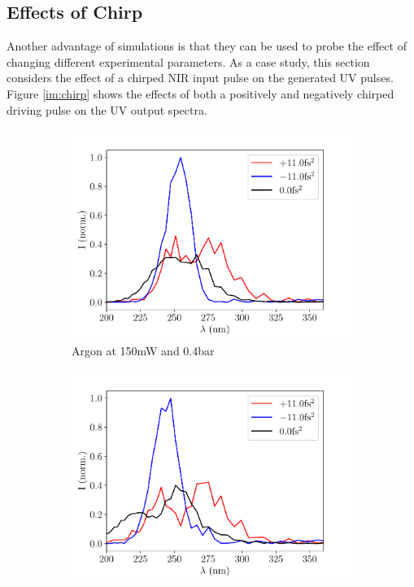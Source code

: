 \documentclass[a4paper]{jpconf}
\begin{document}
\subsection{Effects of Chirp}
Another advantage of simulations is that they can be used to probe the effect of changing different experimental parameters. As a case study, this section considers the effect of a chirped NIR input pulse on the generated UV pulses. Figure \ref{im:chirp} shows the effects of both a positively and negatively chirped driving pulse on the UV output spectra. 
\begin{figure}[h]
\centering
 \begin{subfigure}{0.49\textwidth}
\includegraphics[width=\textwidth]{im/Ar_chirp}
\caption{Argon at 150mW and 0.4bar}\label{im:chirp_Ar}
\end{subfigure}
 \begin{subfigure}{0.49\textwidth}
\includegraphics[width=\textwidth]{im/Ne_chirp}

\end{subfigure}
\end{figure}
\end{document}
